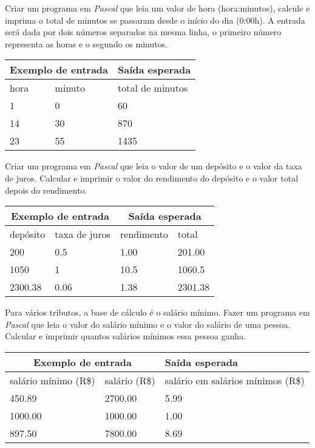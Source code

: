 \item Criar um programa em \emph{Pascal} que leia um valor de hora 
(hora:minutos), calcule e imprima o total de minutos se passaram desde o 
início do dia (0:00h). A entrada será dada por dois números separados
na mesma linha, o primeiro número representa as horas e o segundo os minutos.

\begin{center}
\begin{tabular}{|l|l|l|} \hline
\multicolumn{2}{|c|}{Exemplo de entrada} & Saída esperada \\ \hline
hora & minuto & total de minutos \\ \hline
1 & 0          & 60                \\ \hline
14 & 30       & 870             \\ \hline
23 & 55     & 1435          \\ \hline
\end{tabular}
\end{center}

\item Criar um programa em \emph{Pascal} que leia o valor de um depósito e o 
valor da taxa de juros. Calcular e imprimir o valor do rendimento do depósito 
e o valor total depois do rendimento.

\begin{center}
\begin{tabular}{|l|l|l|l|} \hline
\multicolumn{2}{|c|}{Exemplo de entrada} & \multicolumn{2}{|c|}{Saída esperada} \\ \hline
depósito & taxa de juros & rendimento & total \\ \hline
200 & 0.5 & 1.00   & 201.00            \\ \hline
1050 & 1 & 10.5    & 1060.5           \\ \hline
2300.38 & 0.06 & 1.38   & 2301.38          \\ \hline
\end{tabular}
\end{center}

\item Para vários tributos, a base de cálculo é o salário mínimo. Fazer um 
programa em \emph{Pascal} que leia o valor do salário mínimo e o valor do 
salário de uma pessoa. Calcular e imprimir quantos salários mínimos essa 
pessoa ganha.

\begin{center}
\begin{tabular}{|l|l|l|} \hline
\multicolumn{2}{|c|}{Exemplo de entrada} & Saída esperada \\ \hline
salário mínimo (R\$) & salário (R\$) & salário em salários mínimos (R\$) \\ \hline
450.89 & 2700.00 & 5.99            \\ \hline
1000.00& 1000.00 & 1.00           \\ \hline
897.50& 7800.00 & 8.69          \\ \hline
\end{tabular}
\end{center}


